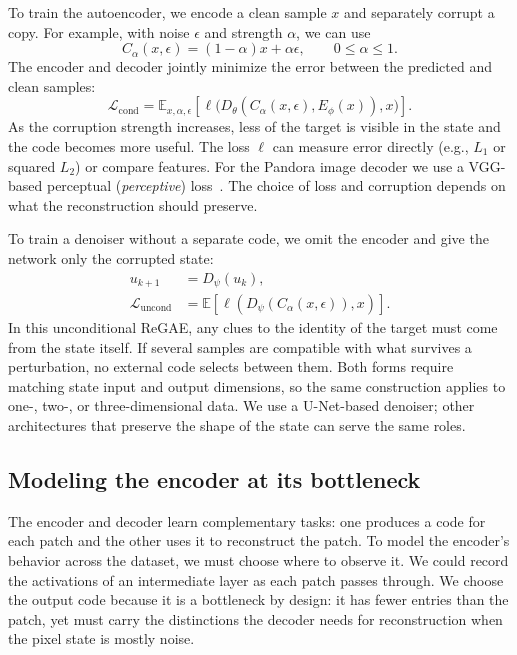 To train the autoencoder, we encode a clean sample $x$ and separately corrupt a copy. For example, with noise $\epsilon$ and strength $\alpha$, we can use
\begin{equation}
 C_\alpha(x,\epsilon)=(1-\alpha)x+\alpha\epsilon,
 \qquad 0\leq\alpha\leq1.
 \label{eq:family-corruption}
\end{equation}
The encoder and decoder jointly minimize the error between the predicted and clean samples:
\begin{equation}
 \mathcal L_{\mathrm{cond}}=
 \mathbb E_{x,\alpha,\epsilon}
 \!\left[\ell\bigl(D_\theta(C_\alpha(x,\epsilon),E_\phi(x)),x\bigr)\right].
 \label{eq:family-conditional-loss}
\end{equation}
As the corruption strength increases, less of the target is visible in the state and the code becomes more useful. The loss $\ell$ can measure error directly (e.g., $L_1$ or squared $L_2$) or compare features. For the Pandora image decoder we use a VGG-based perceptual (\emph{perceptive}) loss~\cite{vgg,perceptual}. The choice of loss and corruption depends on what the reconstruction should preserve.

To train a denoiser without a separate code, we omit the encoder and give the network only the corrupted state:
\begin{equation}
 \begin{aligned}
 u_{k+1}&=D_\psi(u_k),\\
 \mathcal L_{\mathrm{uncond}}&=
 \mathbb E\!\left[\ell(D_\psi(C_\alpha(x,\epsilon)),x)\right].
 \end{aligned}
 \label{eq:family-unconditional}
\end{equation}
In this unconditional ReGAE, any clues to the identity of the target must come from the state itself. If several samples are compatible with what survives a perturbation, no external code selects between them. Both forms require matching state input and output dimensions, so the same construction applies to one-, two-, or three-dimensional data. We use a U-Net-based denoiser; other architectures that preserve the shape of the state can serve the same roles.

\subsection{Modeling the encoder at its bottleneck}
\label{sec:composition}

The encoder and decoder learn complementary tasks: one produces a code for each patch and the other uses it to reconstruct the patch. To model the encoder's behavior across the dataset, we must choose where to observe it. We could record the activations of an intermediate layer as each patch passes through. We choose the output code because it is a bottleneck by design: it has fewer entries than the patch, yet must carry the distinctions the decoder needs for reconstruction when the pixel state is mostly noise.

